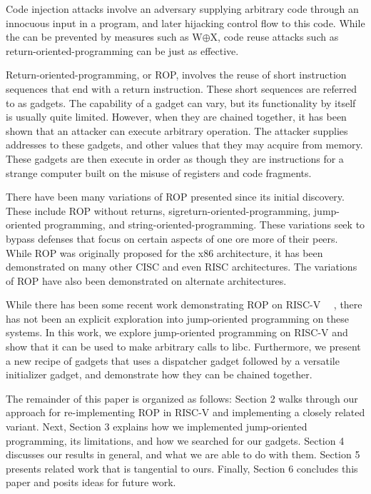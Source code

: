 Code injection attacks involve an adversary supplying arbitrary code through an
innocuous input in a program, and later hijacking control flow to this code.
While the can be prevented by measures such as W$\oplus$X, code reuse attacks
such as return-oriented-programming can be just as effective.

Return-oriented-programming, or ROP, involves the reuse of short instruction
sequences that end with a return instruction. These short sequences are referred
to as gadgets. The capability of a gadget can vary, but its functionality by
itself is usually quite limited. However, when they are chained together, it has
been shown that an attacker can execute arbitrary operation. The attacker
supplies addresses to these gadgets, and other values that they may acquire from
memory. These gadgets are then execute in order as though they are instructions
for a strange computer built on the misuse of registers and code fragments.

There have been many variations of ROP presented since its initial discovery.
These include ROP without returns, sigreturn-oriented-programming,
jump-oriented programming, and string-oriented-programming. These variations
seek to bypass defenses that focus on certain aspects of one ore more of their
peers. While ROP was originally proposed for the x86 architecture, it has been
demonstrated on many other CISC and even RISC architectures. The variations of
ROP have also been demonstrated on alternate architectures.

While there has been some recent work demonstrating ROP on RISC-V~%
~\cite{gu20ropriscv,jayolan20ropriscv}, there has not been an explicit
exploration into jump-oriented programming on these systems. In this work, we
explore jump-oriented programming on RISC-V and show that it can be used to make
arbitrary calls to libc. Furthermore, we present a new recipe of gadgets that
uses a dispatcher gadget followed by a versatile initializer gadget, and
demonstrate how they can be chained together.

The remainder of this paper is organized as follows: Section 2 walks through our
approach for re-implementing ROP in RISC-V and implementing a closely related
variant. Next, Section 3 explains how we implemented jump-oriented programming,
its limitations, and how we searched for our gadgets. Section 4 discusses our
results in general, and what we are able to do with them. Section 5 presents
related work that is tangential to ours. Finally, Section 6 concludes this paper
and posits ideas for future work.

